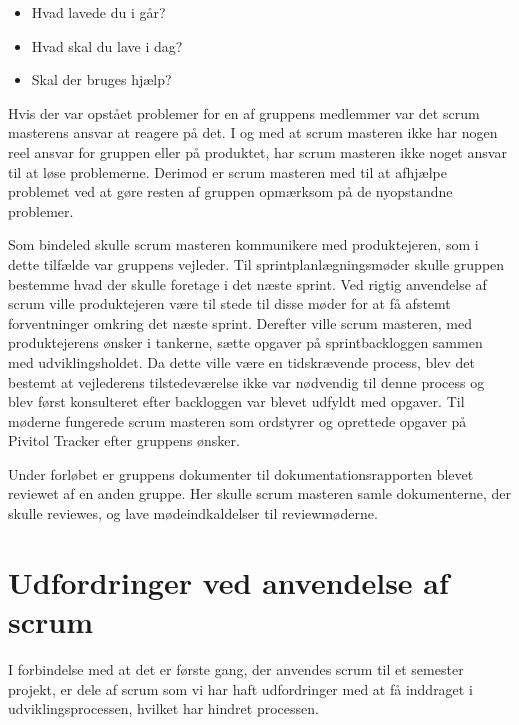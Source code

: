 	\begin{itemize}
		\item Hvad lavede du i går?
		\item Hvad skal du lave i dag?
		\item Skal der bruges hjælp?
	\end{itemize} 
	
	Hvis der var opstået problemer for en af gruppens medlemmer var det scrum masterens ansvar at reagere på det. I og med at scrum masteren ikke har nogen reel ansvar for gruppen eller på produktet, har scrum masteren ikke noget ansvar til at løse problemerne. Derimod er scrum masteren med til at afhjælpe problemet ved at gøre resten af gruppen opmærksom på de nyopstandne problemer. 
	
	Som bindeled skulle scrum masteren kommunikere med produktejeren, som i dette tilfælde var gruppens vejleder. Til sprintplanlægningsmøder skulle gruppen bestemme hvad der skulle foretage i det næste sprint. Ved rigtig anvendelse af scrum ville produktejeren være til stede til disse møder for at få afstemt forventninger omkring det næste sprint. Derefter ville scrum masteren, med produktejerens ønsker i tankerne, sætte opgaver på sprintbackloggen sammen med udviklingsholdet. Da dette ville være en tidskrævende process, blev det bestemt at vejlederens tilstedeværelse ikke var nødvendig til denne process og blev først konsulteret efter backloggen var blevet udfyldt med opgaver. Til møderne fungerede scrum masteren som ordstyrer og oprettede opgaver på Pivitol Tracker efter gruppens ønsker. \par 
	Under forløbet er gruppens dokumenter til dokumentationsrapporten blevet reviewet af en anden gruppe. Her skulle scrum masteren samle dokumenterne, der skulle reviewes, og lave mødeindkaldelser til reviewmøderne.
	
	
	
	\section{Udfordringer ved anvendelse af scrum}
	I forbindelse med at det er første gang, der anvendes scrum til et semester projekt, er dele af scrum som vi har haft udfordringer med at få inddraget i udviklingsprocessen, hvilket har hindret processen. \newline
	
